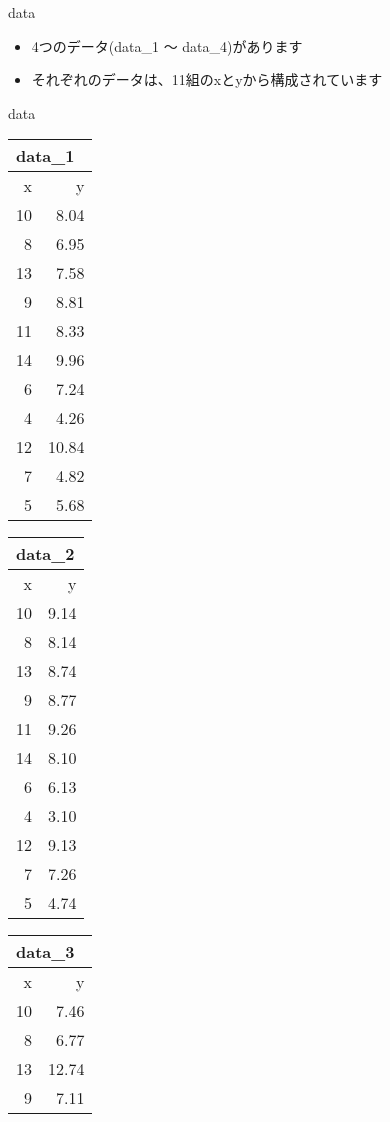 \documentclass[
  ignorenonframetext,
]{beamer}
\begin{document}
\begin{frame}{data}
\protect\hypertarget{data}{}
\begin{itemize}[<+->]
\item
  4つのデータ(data\_1 ～ data\_4)があります
\item
  それぞれのデータは、11組のxとyから構成されています
\end{itemize}
\end{frame}

\begin{frame}{data}
\protect\hypertarget{data-1}{}
\begin{tabular}{rr}
\multicolumn{2}{l}{data\_1}\\
\toprule
x & y\\
\midrule
10 & 8.04\\
8 & 6.95\\
13 & 7.58\\
9 & 8.81\\
11 & 8.33\\
14 & 9.96\\
6 & 7.24\\
4 & 4.26\\
12 & 10.84\\
7 & 4.82\\
5 & 5.68\\
\bottomrule
\end{tabular}\hfill
\begin{tabular}{rr}
\multicolumn{2}{l}{data\_2}\\
\toprule
x & y\\
\midrule
10 & 9.14\\
8 & 8.14\\
13 & 8.74\\
9 & 8.77\\
11 & 9.26\\
14 & 8.10\\
6 & 6.13\\
4 & 3.10\\
12 & 9.13\\
7 & 7.26\\
5 & 4.74\\
\bottomrule
\end{tabular}\hfill
\begin{tabular}{rr}
\multicolumn{2}{l}{data\_3}\\
\toprule
x & y\\
\midrule
10 & 7.46\\
8 & 6.77\\
13 & 12.74\\
9 & 7.11\\

\end{tabular}
\end{frame}
\end{document}
